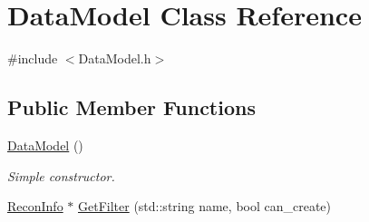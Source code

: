\hypertarget{classDataModel}{\section{Data\-Model Class Reference}
\label{classDataModel}
}


{\ttfamily \#include $<$Data\-Model.\-h$>$}

\subsection*{Public Member Functions}
\begin{DoxyCompactItemize}
\item 
\hypertarget{classDataModel_abff03aef2cb531142a35781bb87c3365}{\hyperlink{classDataModel_abff03aef2cb531142a35781bb87c3365}{Data\-Model} ()}\label{classDataModel_abff03aef2cb531142a35781bb87c3365}

\begin{DoxyCompactList}\small\item\em Simple constructor. \end{DoxyCompactList}\item 
\hyperlink{classReconInfo}{Recon\-Info} $\ast$ \hyperlink{classDataModel_a1887c7e14241754c9967876de5b3495a}{Get\-Filter} (std\-::string name, bool can\-\_\-create)
\end{DoxyCompactItemize}
